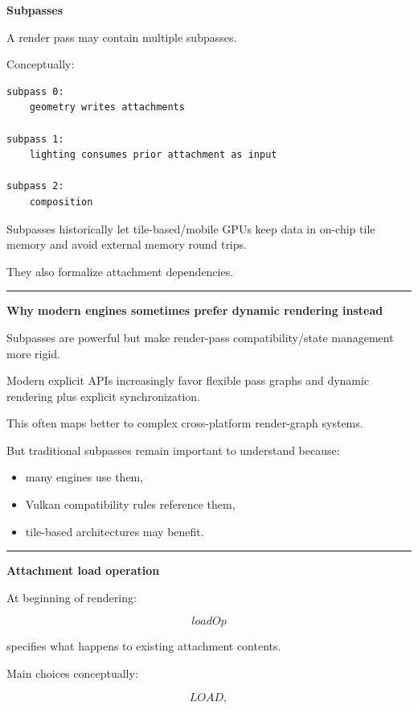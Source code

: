 \textbf{Subpasses}

A render pass may contain multiple subpasses.

Conceptually:

\begin{verbatim}
subpass 0:
    geometry writes attachments

subpass 1:
    lighting consumes prior attachment as input

subpass 2:
    composition
\end{verbatim}

Subpasses historically let tile-based/mobile GPUs keep data in on-chip tile memory and avoid external memory round trips.

They also formalize attachment dependencies.

\begin{center}\rule{0.5\linewidth}{0.5pt}\end{center}

\textbf{Why modern engines sometimes prefer dynamic rendering instead}

Subpasses are powerful but make render-pass compatibility/state management more rigid.

Modern explicit APIs increasingly favor flexible pass graphs and dynamic rendering plus explicit synchronization.

This often maps better to complex cross-platform render-graph systems.

But traditional subpasses remain important to understand because:

\begin{itemize}
\tightlist
\item
  many engines use them,
\item
  Vulkan compatibility rules reference them,
\item
  tile-based architectures may benefit.
\end{itemize}

\begin{center}\rule{0.5\linewidth}{0.5pt}\end{center}

\textbf{Attachment load operation}

At beginning of rendering:

\[
loadOp
\]

specifies what happens to existing attachment contents.

Main choices conceptually:

\[
LOAD,
\]

